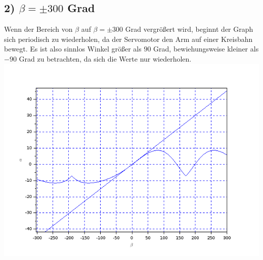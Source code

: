 \subsection{2) $\beta = \pm 300$ Grad}
Wenn der Bereich von $\beta$ auf $\beta=\pm300$ Grad vergrößert wird, beginnt der Graph sich periodisch zu wiederholen, da der Servomotor den Arm auf einer Kreisbahn bewegt. Es ist also sinnlos Winkel größer als $90$ Grad, bewiehungsweise kleiner als $-90$ Grad zu betrachten, da sich die Werte nur wiederholen. \\
\includegraphics[scale=0.5]{images/plot2.png}